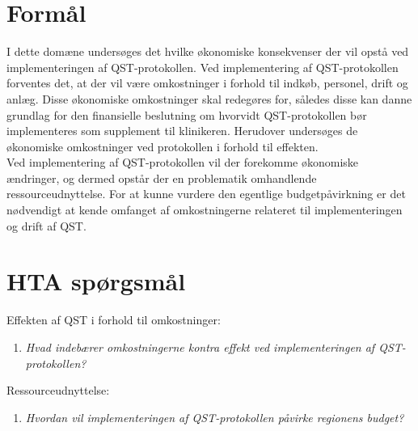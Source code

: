 \section{Formål}
I dette domæne undersøges det hvilke økonomiske konsekvenser der vil opstå ved implementeringen af QST-protokollen. Ved implementering af QST-protokollen forventes det, at der vil være omkostninger i forhold til indkøb, personel, drift og anlæg. Disse økonomiske omkostninger skal redegøres for, således disse kan danne grundlag for den finansielle beslutning om hvorvidt QST-protokollen bør implementeres som supplement til klinikeren. Herudover undersøges de økonomiske omkostninger ved protokollen i forhold til effekten.\\ 
Ved implementering af  QST-protokollen vil der forekomme økonomiske ændringer, og dermed opstår der en problematik omhandlende ressourceudnyttelse. For at kunne vurdere den egentlige budgetpåvirkning er det nødvendigt at kende omfanget af  omkostningerne relateret til implementeringen og drift af QST. 

\section{HTA spørgsmål}
Effekten af QST i forhold til omkostninger:
\begin{enumerate}
	\item \textit{Hvad indebærer omkostningerne kontra effekt ved implementeringen af QST-protokollen?}
\end{enumerate}

Ressourceudnyttelse:
\begin{enumerate}[resume]
	\item \textit{Hvordan vil implementeringen af QST-protokollen påvirke regionens budget?} %
\end{enumerate}

